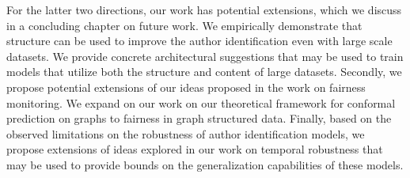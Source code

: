 For the latter two directions, our work has potential extensions, which we discuss in a concluding chapter on future work.
We empirically demonstrate that structure can be used to improve the author identification even with large scale datasets.
We provide concrete architectural suggestions that may be used to train models that utilize both the structure and content of large datasets.
Secondly, we propose potential extensions of our ideas proposed in the work on fairness monitoring.
We expand on our work on our theoretical framework for conformal prediction on graphs to fairness in graph structured data.
Finally, based on the observed limitations on the robustness of author identification models, we propose extensions of ideas explored in our work on temporal robustness that may be used to provide bounds on the generalization capabilities of these models.

